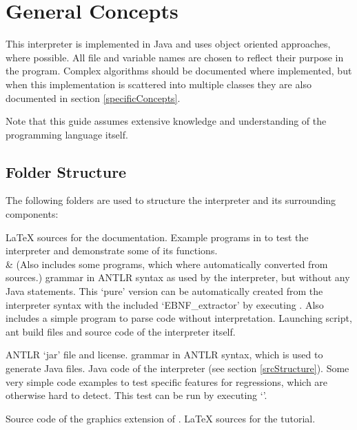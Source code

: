\section{General Concepts}

This interpreter is implemented in Java and uses object oriented approaches, where possible. All file and variable names are chosen to reflect their purpose in the program. Complex algorithms should be documented where implemented, but when this implementation is scattered into multiple classes they are also documented in section \ref{specificConcepts}.

Note that this guide assumes extensive knowledge and understanding of the \SetlX{} programming language itself.

\subsection{Folder Structure}

The following folders are used to structure the interpreter and its surrounding components:

\begin{itemize}
			{\LaTeX{} sources for the documentation.}
			{Example programs in \SetlX{} to test the interpreter and demonstrate some of its functions.\\&
			 (Also includes some programs, which where automatically converted from \SetlTwo{} sources.)}
			{\SetlX{} grammar in ANTLR syntax as used by the interpreter, but without any Java statements. This `pure' version can be automatically created from the interpreter syntax with the included `EBNF\_extractor' by executing . Also includes a simple program to parse \SetlX{} code without interpretation.}
			{Launching script, ant build files and source code of the interpreter itself.}
	\begin{itemize}
				{ANTLR `jar' file and license.}
				{\SetlX{} grammar in ANTLR syntax, which is used to generate Java files.}
				{Java code of the interpreter (see section \ref{srcStructure}).}
				{Some very simple \SetlX{} code examples to test specific features for regressions, which are otherwise hard to detect. This test can be run by executing `'.}
	\end{itemize}
			{Source code of the graphics extension of \setlX.}
			{\LaTeX{} sources for the tutorial.}
\end{itemize}

